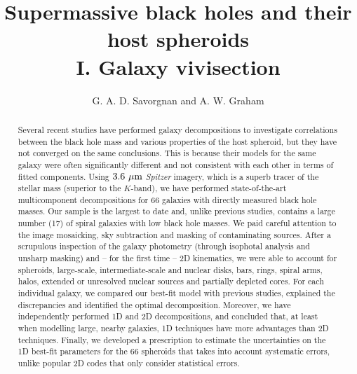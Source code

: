 \documentclass[preprint2]{emulateapj}
\begin{document}
\title{Supermassive black holes and their host spheroids \\ I. Galaxy vivisection}

\author{G. A. D. Savorgnan and A. W. Graham}



\begin{abstract}
Several recent studies have performed galaxy decompositions 
to investigate correlations between the black hole mass and various properties of the host spheroid, 
but they have not converged on the same conclusions. 
This is because their models for the same galaxy were often significantly different 
and not consistent with each other in terms of fitted components. 
Using $3.6 \rm ~\mu m$ \emph{Spitzer} imagery, which is a superb tracer of the stellar mass (superior to the $K$-band), 
we have performed state-of-the-art multicomponent decompositions for 66 galaxies 
with directly measured black hole masses. 
Our sample is the largest to date and, 
unlike previous studies, contains a large number (17) of spiral galaxies with low black hole masses. 
We paid careful attention to the image mosaicking, sky subtraction and masking of contaminating sources.
After a scrupulous inspection of the galaxy photometry (through isophotal analysis and unsharp masking) and -- for the first time -- 2D kinematics, 
we were able to account for spheroids, large-scale, intermediate-scale and nuclear disks, bars, rings, spiral arms, halos, extended or unresolved nuclear 
sources and partially depleted cores. 
For each individual galaxy, we compared our best-fit model with previous studies, 
explained the discrepancies and identified the optimal decomposition.
Moreover, we have independently performed 1D and 2D decompositions, 
and concluded that, at least when modelling large, nearby galaxies, 1D techniques have more advantages than 2D techniques. 
Finally, we developed a prescription to estimate the uncertainties on the 1D best-fit parameters for the 66 spheroids 
that takes into account systematic errors, 
unlike popular 2D codes that only consider statistical errors.

\end{abstract}

\end{document}
